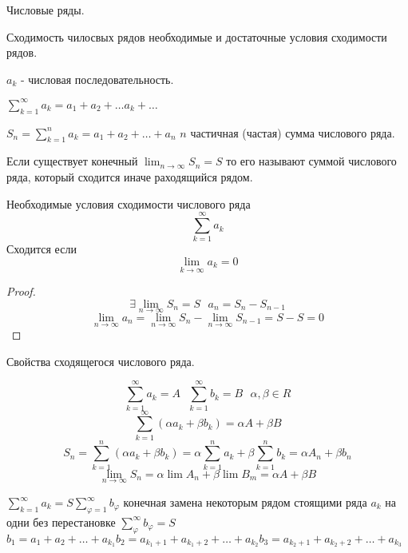 \begin{title}
  Числовые ряды.
\end{title}

\begin{title}[\Large]
  Сходимость чилосвых рядов необходимые и достаточные условия сходимости рядов.
\end{title}

  $a_k$ - числовая последовательность.

  $\sum_{k=1}^{\infty} a_k = a_1 + a_2 + \ldots a_k + \ldots$

  $S_n = \sum_{k=1}^n a_k = a_1 + a_2 + \ldots + a_n$ $n$ частичная (частая)
сумма числового ряда.

  Если существует конечный $\lim_{n \to \infty} S_n = S$ то его называют суммой
числового ряда, который сходится иначе раходящийся рядом.

\begin{theorem}
  Необходимые условия сходимости числового ряда
  $$
  \sum_{k=1}^{\infty} a_k
  $$
  Сходится если
  $$
  \lim_{k \to \infty} a_k = 0
  $$
\end{theorem}

\begin{proof}
  $$
  \exists \lim_{n \to \infty} S_n = S ~~~ a_n = S_n - S_{n-1}
  $$
  $$
  \lim_{n \to \infty} a_n = \lim_{n \to \infty} S_n -
  \lim_{n \to \infty} S_{n-1} = S - S = 0
  $$
\end{proof}

\begin{title}[\Large]
  Свойства сходящегося числового ряда.
\end{title}

\begin{theorem}
  $$
  \sum_{k=1}^{\infty} a_k = A ~~~
  \sum_{k=1}^{\infty} b_k = B ~~~
  \alpha, \beta \in R
  $$
  $$
  \sum_{k=1}^{\infty} (\alpha a_k + \beta b_k) = \alpha A + \beta B
  $$
  $$
  S_n = \sum_{k=1}^n (\alpha a_k + \beta b_k) =
  \alpha \sum_{k=1}^n a_k + \beta \sum_{k=1}^n b_k = \alpha A_n + \beta b_n
  $$
  $$
  \lim_{n \to \infty} S_n = \alpha \lim A_n + \beta \lim B_m
  = \alpha A + \beta B
  $$
\end{theorem}

\begin{theorem}
  $
  \sum_{k=1}^{\infty} a_k = S \sum_{\varphi = 1}^{\infty} b_{\varphi}
  $
  конечная замена некоторым рядом стоящими ряда $a_k$ на одни без перестановке
  $
  \sum_{\varphi}^{\infty} b_{\varphi} = S
  $
  $
  b_1 = a_1 + a_2 + \ldots + a_{k_1}
  b_2 = a_{k_1+1} + a_{k_1+2} + \ldots + a_{k_2}
  b_3 = a_{k_2+1} + a_{k_2+2} + \ldots + a_{k_3}
  $
\end{theorem}

